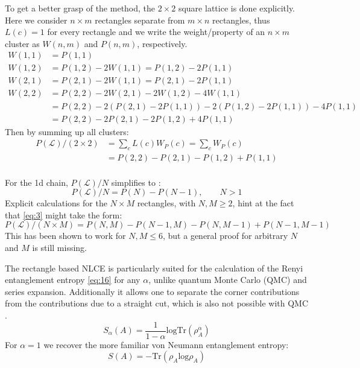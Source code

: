 \documentclass[a4paper,12pt]{article}
\begin{document}
To get a better grasp of the method, the $2 \times 2$ square lattice
is done explicitly. Here we consider $ n \times m$ rectangles separate from
$m \times n$ rectangles, thus $L(c) = 1$ for every rectangle and we
write the weight/property of an $n \times m$ cluster as $W(n,m)$ and
$P(n,m)$, respectively.
\begin{align*}
W(1,1) &= P(1,1)\\
W(1,2) &= P(1,2) - 2W(1,1) = P(1,2) -2 P(1,1)\\
W(2,1) &= P(2,1) - 2W(1,1) = P(2,1) -2 P(1,1)\\
W(2,2) &= P(2,2) -2 W(2,1) -2 W(1,2) -4 W(1,1)\\
&= P(2,2) - 2 (P(2,1) -2
         P(1,1)) - 2(P(1,2) -2 P(1,1)) - 4 P(1,1)\\
&= P(2,2) -2 P(2,1) - 2 P(1,2) + 4 P(1,1)
\end{align*}
Then by summing up all clusters:
\begin{align*}
\label{eq:17}
P(\mathcal{L})/(2 \times 2) &=\sum\limits_c L(c) W_P(c) = \sum\limits_c
                      W_P(c)\\
 &= P(2,2) - P(2,1) - P(1,2) + P(1,1)
\end{align*}
\\
For the 1d chain, $P(\mathcal{L})/N$ simplifies to \cite{Melko}:
\begin{equation}
\label{eq:20}
P(\mathcal{L})/N = P(N) - P(N-1), \qquad N>1
\end{equation}
Explicit calculations for the $N \times M$ rectangles, with $N,M \geq 2$, hint at the fact that
\eqref{eq:3} might take the form:
\begin{equation}
\label{eq:21}
P(\mathcal{L})/(N \times M) = P(N,M) - P(N-1,M) - P(N,M-1) +
P(N-1,M-1)
\end{equation}
This has been shown to work for $N,M \leq 6$, but a general proof for
arbitrary $N$ and $M$ is still missing.

The rectangle based NLCE is particularly suited for the calculation of the
Renyi entanglement entropy \eqref{eq:16} for any $\alpha$, unlike
quantum Monte Carlo (QMC) and series expansion. Additionally it allows one
to separate the corner contributions from the contributions due to a
straight cut, which is also not possible with QMC \cite{Kallin,Melko}.\\
\begin{equation}
\label{eq:16}
S_{\alpha}(A) = \frac{1}{1-\alpha} \text{logTr}(\rho^{\alpha}_A)
\end{equation}
For $\alpha = 1$ we recover the more familiar von Neumann entanglement
entropy:
\begin{equation}
\label{eq:27}
S(A) = -\text{Tr}(\rho_A \text{log} \rho_A)
\end{equation}
\end{document}
